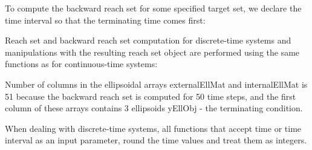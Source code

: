 \documentclass[letterpaper,10pt,english]{sphinxmanual}
\begin{document}
To compute the backward reach set for some specified target set, we
declare the time interval so that the terminating time comes first:

Reach set and backward reach set computation for discrete-time systems
and manipulations with the resulting reach set object are performed
using the same functions as for continuous-time systems:

Number of columns in the ellipsoidal arrays externalEllMat and
internalEllMat is 51 because the backward reach set is computed
for 50 time steps, and the first column of these arrays contains
3 ellipsoids yEllObj - the terminating condition.

When dealing with discrete-time systems, all functions that accept time
or time interval as an input parameter, round the time values and treat
them as integers.
\end{document}
